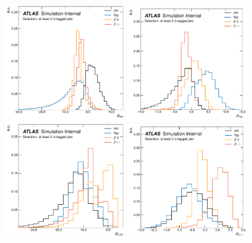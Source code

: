 \begin{figure}[!htb]
    \begin{center}
        \includegraphics[width=0.48\textwidth]{figures/search_hh/nn_disc/pi_plot_NN_d_hh}
        \includegraphics[width=0.48\textwidth]{figures/search_hh/nn_disc/pi_plot_NN_d_top}
        \includegraphics[width=0.48\textwidth]{figures/search_hh/nn_disc/pi_plot_NN_d_zsf}
        \includegraphics[width=0.48\textwidth]{figures/search_hh/nn_disc/pi_plot_NN_d_ztt}
        \caption{
        }
        \label{fig:nn_disc_d}
    \end{center}
\end{figure}
